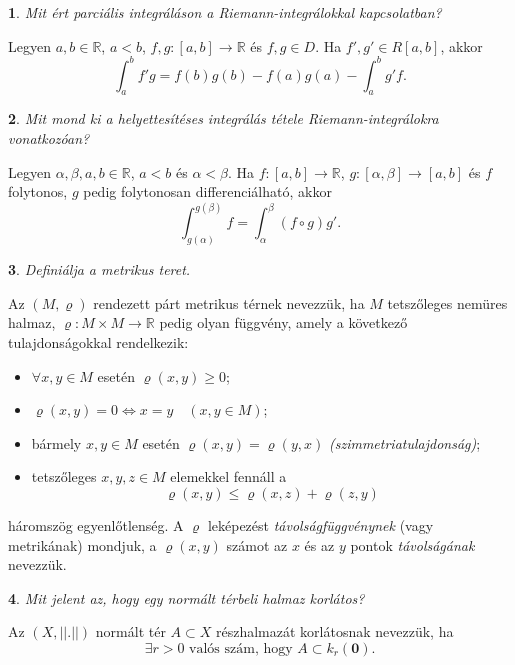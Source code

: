 \documentclass[a4paper]{article}
\def\R{\mathbb{R}}
\theoremstyle{qstyle}
\newtheorem{question}{}{}
\begin{document}
	\begin{question}
		Mit ért parciális integráláson a Riemann-integrálokkal kapcsolatban?
	\end{question}
	Legyen $a,b \in \R$, $a < b$, $f,g : [a,b] \to \R$ és $f,g \in D$. Ha $f', g' \in R[a,b]$, akkor
	$$
	\int_{a}^{b} f'g = f(b)g(b) - f(a)g(a) - \int_{a}^{b} g'f \text{.}
	$$
	
	\begin{question}
		Mit mond ki a helyettesítéses integrálás tétele Riemann-integrálokra vonatkozóan? 
	\end{question}
	Legyen $\alpha, \beta, a, b \in \R$, $a < b$ és $\alpha < \beta$. Ha $f : [a,b] \to \R$, $g : [\alpha, \beta] \to [a,b]$ és $f$ folytonos, $g$ pedig folytonosan differenciálható, akkor
	$$
	\int_{g(\alpha)}^{g(\beta)} f = \int_{\alpha}^{\beta} (f \circ g)g' \text{.}
	$$
	
	\begin{question}
		Definiálja a metrikus teret.  
	\end{question}
	Az $(M, \varrho)$ rendezett párt metrikus térnek nevezzük, ha $M$ tetszőleges nemüres halmaz, $\varrho : M \times M \to \R$ pedig olyan függvény, amely a következő tulajdonságokkal rendelkezik:
	\begin{itemize}
		\item $\forall x,y \in M$ esetén $\varrho(x,y) \ge 0$;
		\item $\varrho(x,y) = 0 \Longleftrightarrow x = y \quad (x,y \in M)$;
		\item bármely $x,y \in M$ esetén $\varrho(x,y) = \varrho(y,x)$ \emph{(szimmetriatulajdonság)};
		\item tetszőleges $x,y,z \in M$ elemekkel fennáll a
		$$\varrho(x,y) \le \varrho(x,z) + \varrho(z,y)$$
	\end{itemize}
	háromszög egyenlőtlenség. A $\varrho$ leképezést \emph{távolságfüggvénynek} (vagy metrikának) mondjuk, a $\varrho(x,y)$ számot az $x$ és az $y$ pontok \emph{távolságának} nevezzük. 	
	
	\begin{question}
		Mit jelent az, hogy egy normált térbeli halmaz korlátos?   
	\end{question}
	Az $(X, ||.||)$ normált tér $A \subset X$ részhalmazát korlátosnak nevezzük, ha
	$$\exists r > 0 \text{ valós szám, hogy  } A \subset k_{r}(\boldsymbol{0})\text{.}$$
		
		\newpage 
		
\end{document}
